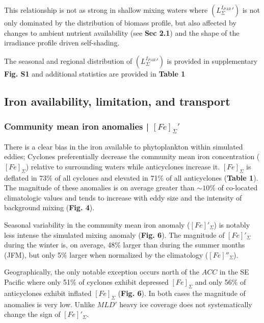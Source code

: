 \documentclass{article}
\begin{document}
This relationship is not as strong in shallow mixing waters where $(L_\Sigma^{I_{PAR}}')$ is not only dominated by the distribution of biomass profile, but also affected by changes to ambient nutrient availability (see \textbf{Sec 2.1}) and the shape of the irradiance profile driven self-shading. 

The seasonal and regional distribution of $(L_\Sigma^{I_{PAR}}')$ is provided in supplementary \textbf{Fig. S1} and additional statistics are provided in \textbf{Table 1}


\subsection{Iron availability, limitation, and transport}

\subsubsection{Community mean iron anomalies | $[Fe]_\Sigma'$}

There is a clear bias in the iron available to phytoplankton within simulated eddies; Cyclones preferentially decrease the community mean iron concentration ($[Fe]_\Sigma$) relative to surrounding waters while anticyclones increase it. $[Fe]_\Sigma$ is deflated in 73\% of all cyclones and elevated in 71\% of all anticyclones (\textbf{Table 1}). The magnitude of these anomalies is on average greater than $\sim10\%$ of co-located climatologic values and tends to increase with eddy size and the intensity of background mixing (\textbf{Fig. 4}).

Seasonal variability in the community mean iron anomaly ($[Fe]'_\Sigma$) is notably less intense the simulated mixing anomaly (\textbf{Fig. 6}). The magnitude of $[Fe]'_\Sigma$ during the winter is, on average, 48\% larger than during the summer months (JFM), but only 5\% larger when normalized by the climatology ($[Fe]''_\Sigma$).

Geographically, the only notable exception occurs north of the $ACC$ in the SE Pacific where only 51\% of cyclones exhibit depressed $[Fe]_\Sigma$ and only 56\% of anticyclones exhibit inflated $[Fe]_\Sigma$ (\textbf{Fig. 6}). In both cases the magnitude of anomalies is very low. Unlike $MLD'$ heavy ice coverage does not systematically change the sign of $[Fe]'_\Sigma$. 
\end{document}
